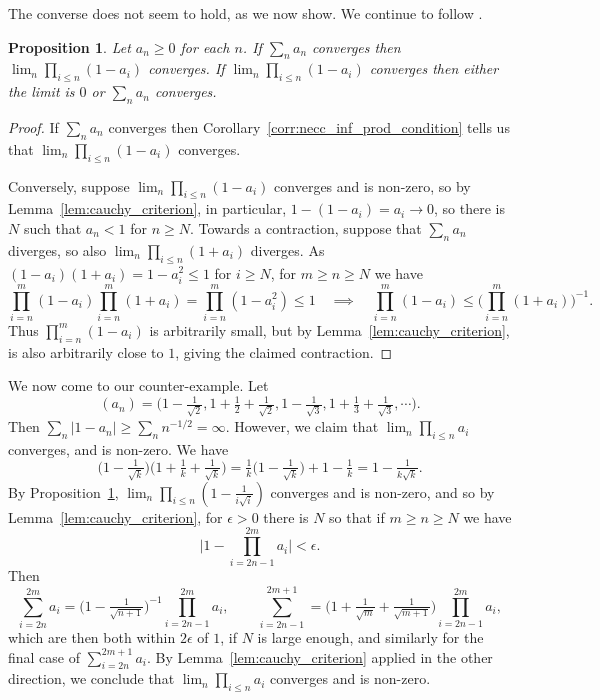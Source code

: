 \documentclass[twoside,a4paper,12pt]{article}
\theoremstyle{plain}
\newtheorem{proposition}{Proposition}[section]
\theoremstyle{definition}
\begin{document}
The converse does not seem to hold, as we now show.  We continue to follow \cite{leonard}.

\begin{proposition}\label{prop:ab_conv}
Let $a_n\geq 0$ for each $n$.  If $\sum_n a_n$ converges then $\lim_n \prod_{i\leq n} (1-a_i)$ converges.  If $\lim_n \prod_{i\leq n} (1-a_i)$ converges then either the limit is $0$ or $\sum_n a_n$ converges.
\end{proposition}
\begin{proof}
If $\sum_n a_n$ converges then Corollary~\ref{corr:necc_inf_prod_condition} tells us that $\lim_n \prod_{i\leq n} (1-a_i)$ converges.

Conversely, suppose $\lim_n \prod_{i\leq n} (1-a_i)$ converges and is non-zero, so by Lemma~\ref{lem:cauchy_criterion}, in particular, $1-(1-a_i) = a_i \to 0$, so there is $N$ such that $a_n<1$ for $n\geq N$.  Towards a contraction, suppose that $\sum_n a_n$ diverges, so also $\lim_n \prod_{i\leq n} (1+a_i)$ diverges.  As $(1-a_i)(1+a_i) = 1-a_i^2 \leq 1$ for $i\geq N$, for $m \geq n \geq N$ we have
\[ \prod_{i=n}^m (1-a_i) \prod_{i=n}^m (1+a_i) = \prod_{i=n}^m (1-a_i^2) \leq 1
\quad\implies\quad
\prod_{i=n}^m (1-a_i) \leq \Big( \prod_{i=n}^m (1+a_i) \Big)^{-1}. \]
Thus $\prod_{i=n}^m (1-a_i)$ is arbitrarily small, but by Lemma~\ref{lem:cauchy_criterion}, is also arbitrarily close to $1$, giving the claimed contraction.
\end{proof}

We now come to our counter-example.  Let
\[ (a_n) = \Big( 1-\tfrac{1}{\sqrt 2}, 1+\tfrac12+\tfrac{1}{\sqrt 2}, 
1-\tfrac{1}{\sqrt 3}, 1+\tfrac13+\tfrac{1}{\sqrt 3}, \cdots \Big). \]
Then $\sum_n |1-a_n| \geq \sum_n n^{-1/2} = \infty$.  However, we claim that $\lim_n \prod_{i\leq n} a_i$ converges, and is non-zero.  We have
\[ \big( 1 - \tfrac{1}{\sqrt{k}} \big) \big( 1 + \tfrac1k + \tfrac{1}{\sqrt{k}} \big)
= \tfrac{1}{k}\big( 1 - \tfrac{1}{\sqrt{k}} \big) + 1 - \tfrac1k
= 1 - \tfrac{1}{k\sqrt k}. \]
By Proposition~\ref{prop:ab_conv}, $\lim_n \prod_{i\leq n} (1-\frac{1}{i\sqrt i})$ converges and is non-zero, and so by Lemma~\ref{lem:cauchy_criterion}, for $\epsilon>0$ there is $N$ so that if $m \geq n \geq N$ we have
\[ \Big| 1 - \prod_{i=2n-1}^{2m} a_i \Big| < \epsilon. \]
Then
\[ \sum_{i=2n}^{2m} a_i = \big(1-\tfrac{1}{\sqrt{n+1}}\big)^{-1}\prod_{i=2n-1}^{2m} a_i, \qquad
\sum_{i=2n-1}^{2m+1} = \big(1+\tfrac{1}{\sqrt{m}}+\tfrac{1}{\sqrt{m+1}}\big)\prod_{i=2n-1}^{2m} a_i, \]
which are then both within $2\epsilon$ of $1$, if $N$ is large enough, and similarly for the final case of $\sum_{i=2n}^{2m+1} a_i$.  By Lemma~\ref{lem:cauchy_criterion} applied in the other direction, we conclude that $\lim_n \prod_{i\leq n} a_i$ converges and is non-zero.
\end{document}
